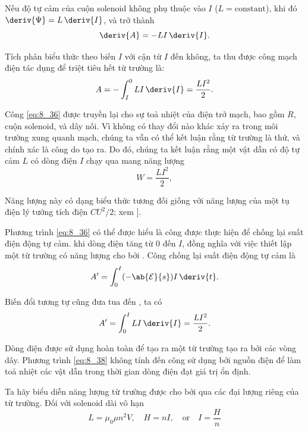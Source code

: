 Nếu độ tự cảm của cuộn solenoid không phụ thuộc vào $I$ ($L=\text{constant}$), khi đó $\deriv{\Psi}=L\,\deriv{I}$, và  trở thành
\begin{equation}\label{eq:8_35}
	\deriv{A} = - LI\, \deriv{I}.
\end{equation}

\noindent
Tích phân biểu thức theo biến $I$ với cận từ $I$ đến không, ta thu được công mạch điện tác dụng để triệt tiêu hết từ trường là:
\begin{equation}\label{eq:8_36}
	A = - \int_I^0 LI\, \deriv{I} = \frac{LI^2}{2}.
\end{equation}

Công \eqref{eq:8_36} được truyền lại cho sự toả nhiệt của điện trở mạch, bao gồm $R$, cuộn solenoid, và dây nối.
Vì không có thay đổi nào khác xảy ra trong môi trường xung quanh mạch, chúng ta vẫn có thể kết luận rằng từ trường là thứ, và chính xác là công do tạo ra.
Do đó, chúng ta kết luận rằng một vật dẫn có độ tự cảm $L$ có dòng điện $I$ chạy qua mang năng lượng
\begin{equation}\label{eq:8_37}
	W = \frac{LI^2}{2},
\end{equation}

\noindent
Năng lượng này có dạng biểu thức tương đối giống với năng lượng của một tụ điện lý tưởng tích điện $CU^2/2$; xem ].

Phương trình \eqref{eq:8_36} có thể được hiểu là công được thực hiện để chống lại suất điện động tự cảm. khi dòng điện tăng từ $0$ đến $I$, đồng nghĩa với việc thiết lập một từ trường có năng lượng cho bởi .
Công chống lại suất điện động tự cảm là
\begin{equation*}
	A' = \int_0^I (-\ab{\mathcal{E}}{s}) I\, \deriv{t}.
\end{equation*}

\noindent
Biến đổi tương tự cũng đưa tua đến , ta có
\begin{equation}\label{eq:8_38}
	A' = \int_0^I LI\, \deriv{I} = \frac{LI^2}{2}.
\end{equation}

\noindent
Dòng điện được sử dụng hoàn toàn để tạo ra một từ trường tạo ra bởi các vòng dây.
Phương trình \eqref{eq:8_38} không tính đến công sử dụng bởi nguồn điện để làm toả nhiệt các vật dẫn trong thời gian dòng điện đạt giá trị ổn định.

Ta hãy biểu diễn năng lượng từ trường được cho bởi  qua các đại lượng riêng của từ trường.
Đối với solenoid dài vô hạn
\begin{equation*}
	L = \mu_0\mu n^2V,\quad H=nI,\quad\text{or}\quad I=\frac{H}{n}
\end{equation*}

